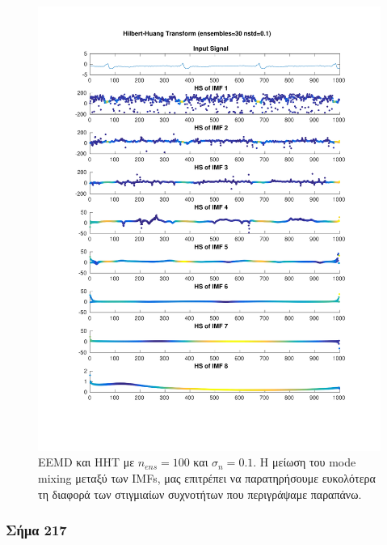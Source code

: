\documentclass[11pt,a4paper]{article}
\begin{document}
\begin{figure}[H]
\begin{minipage}{0.48\textwidth}
	\includegraphics[width=\textwidth]{fig/118l1_hht_ensemble.pdf}
\end{minipage}
\vfill
\caption{EEMD και HHT με $n_{ens}=100$ και $\sigma_n = 0.1$. Η μείωση του mode mixing μεταξύ των IMFs, μας επιτρέπει να παρατηρήσουμε ευκολότερα τη διαφορά των στιγμιαίων συχνοτήτων που περιγράψαμε παραπάνω.}
\label{fig:118l1_hht_ensemble}
\end{figure}


\subsubsection*{Σήμα 217}
\end{document}
